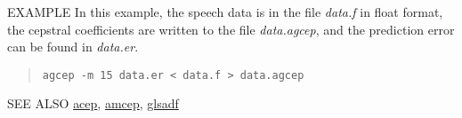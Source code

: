 \begin{options}
\end{options}

\begin{qsection}{EXAMPLE}
	In this example, the speech data is in the file {\em data.f}
        in float format, the cepstral coefficients are written to
        the file {\em data.agcep},
        and the prediction error can be found in {\em data.er}.
\begin{quote}
 \verb!agcep -m 15 data.er < data.f > data.agcep!
\end{quote} 
\end{qsection}

\begin{qsection}{SEE ALSO}
\hyperlink{acep}{acep},
\hyperlink{amcep}{amcep},
\hyperlink{glsadf}{glsadf}
\end{qsection}
